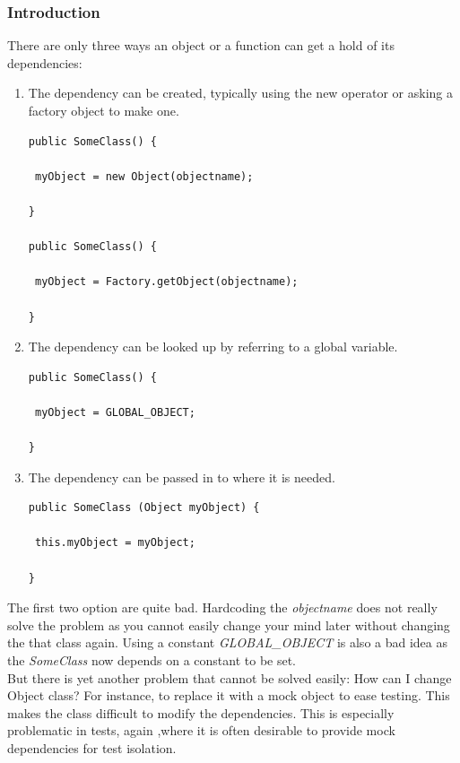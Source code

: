 \documentclass[14pt,a4paper]{extreport}
\begin{document}
			\subsubsection{Introduction}
			There are only three ways an object or a function can get a hold of its dependencies:
\begin{enumerate}
\item The dependency can be created, typically using the new operator or asking a factory object to make one.
\begin{verbatim}
public SomeClass() {

 myObject = new Object(objectname);

}

public SomeClass() {

 myObject = Factory.getObject(objectname);

}
\end{verbatim}
\item The dependency can be looked up by referring to a global variable.
\begin{verbatim}
public SomeClass() {

 myObject = GLOBAL_OBJECT;

}
\end{verbatim}
\item The dependency can be passed in to where it is needed.
\begin{verbatim}
public SomeClass (Object myObject) {

 this.myObject = myObject;

}
\end{verbatim}

\end{enumerate}

The first two option are quite bad. Hardcoding the \emph{objectname} does not really solve the problem as you cannot easily change your mind later without changing the that class again. Using a constant \emph{GLOBAL\_OBJECT} is also a bad idea as the \emph{SomeClass} now depends on a constant to be set.
\\

But there is yet another problem that cannot be solved easily: How can I change Object class? For instance, to replace it with a mock object to ease testing. This makes the class difficult to modify the dependencies. This is especially problematic in tests, again ,where it is often desirable to provide mock dependencies for test isolation\cite{angdocDI}.
\\
\end{document}
